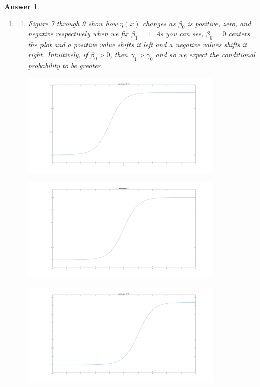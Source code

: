 \documentclass[12pt]{article}
\theoremstyle{colon}
\newtheorem*{answer}{Answer}
\begin{document}
\begin{answer}
\begin{enumerate}[label=\arabic*)]
    \item
      \begin{enumerate}[label=\alph*)]
        \item Figure 7 through 9 show how $\eta(x)$ changes as $\beta_0$ is positive, zero, and negative respectively when we fix $\beta_1 = 1$. As you can see, $\beta_0 = 0$ centers the plot and a positive value shifts it left and a negative values shifts it right. Intuitively, if $\beta_0 > 0$, then $\gamma_1 > \gamma_0$ and so we expect the conditional probability to be greater.
        \begin{center}
          \includegraphics[width=0.8\textwidth]{beta_pos.jpg}
        \end{center}
        \begin{center}
          \includegraphics[width=0.8\textwidth]{beta_0.jpg}
        \end{center}
        \begin{center}
          \includegraphics[width=0.8\textwidth]{beta_neg.jpg}
        \end{center}


\end{enumerate}
\end{enumerate}
\end{answer}
\end{document}
